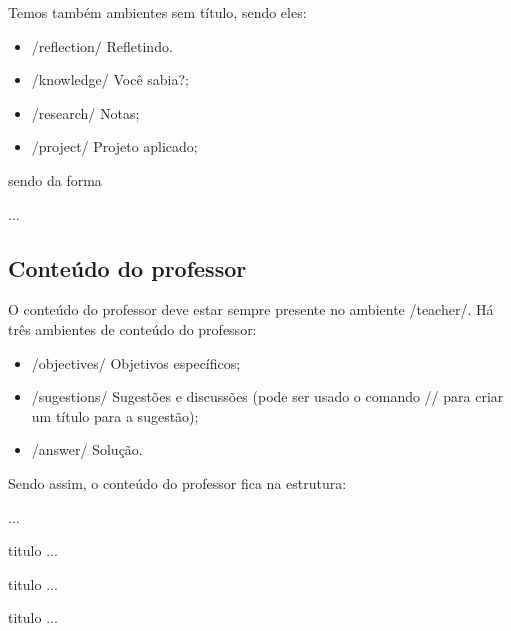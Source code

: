Temos também ambientes sem título, sendo eles:

\begin{itemize}
	\item \latexinline/reflection/ Refletindo.
	\item \latexinline/knowledge/ Você sabia?;
	\item \latexinline/research/ Notas;
	\item \latexinline/project/ Projeto aplicado;
\end{itemize}

sendo da forma

\begin{latexcode}
\begin{knowledge}
  ...
\end{knowledge}
\end{latexcode}

\subsection{Conteúdo do professor}\label{sec:conteudo-professor}

O conteúdo do professor deve estar sempre presente no ambiente
\latexinline/teacher/. Há três ambientes de conteúdo do professor:

\begin{itemize}
	\item \latexinline/objectives/ Objetivos específicos;
	\item \latexinline/sugestions/ Sugestões e discussões (pode ser
	      usado o comando \latexinline// para criar um
	      título para a sugestão);
	\item \latexinline/answer/ Solução.
\end{itemize}

Sendo assim, o conteúdo do professor fica na estrutura:

\begin{latexcode}
\begin{teacher}
  ...

  \begin{objectives}{titulo}
    ...
  \end{objectives}

  \begin{sugestions}{titulo}
     ...
  \end{sugestions}

  \begin{answer}{titulo}
    ...
  \end{answer}
\end{teacher}
\end{latexcode}

